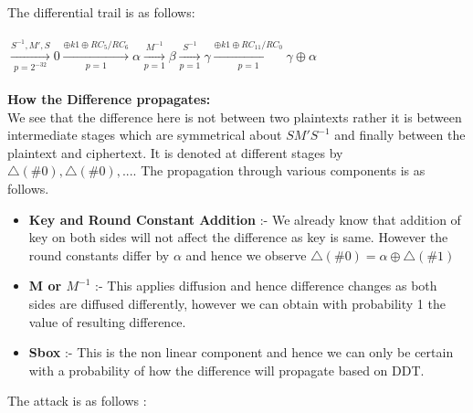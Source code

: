 \documentclass{transcrypto}
\begin{document}
The differential trail is as follows: \\ \\
$\xrightarrow[p=2^{-32}]{S^{-1},M',S}  0 \xrightarrow[p=1]{\oplus k1 \oplus RC_5/RC_6} \alpha \xrightarrow[p=1]{M^{-1}} \beta \xrightarrow[p=1]{S^{-1}} \gamma \xrightarrow[p=1]{\oplus k1 \oplus RC_{11}/RC_0} \gamma \oplus \alpha $ \\ \\
\textbf{How the Difference propagates:}\\
We see that the difference here is not between two plaintexts rather it is between intermediate stages which are symmetrical about $SM'S^{-1}$ and finally between the plaintext and ciphertext. It is denoted at different stages by $\triangle(\#0),\triangle(\#0),...$. The propagation through various components is as follows.
\begin{itemize}
    \item \textbf{Key and Round Constant Addition} :- We already know that addition of key on both sides will not affect the difference as key is same. However the round constants differ by $\alpha$ and hence we observe $\triangle(\#0)=\alpha\oplus\triangle(\#1)$
    \item \textbf{M or $M^{-1}$} :- This applies diffusion and hence difference changes as both sides are diffused differently, however we can obtain with probability 1 the value of resulting difference.
    \item \textbf{Sbox} :- This is the non linear component and hence we can only be certain with a probability of how the difference will propagate based on DDT.
\end{itemize}
The attack is as follows : \\ \\
\end{document}
